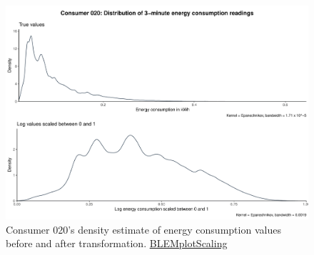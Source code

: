 \begin{centering}
\begin{figure}[!htbp]
        \includegraphics[width=\textwidth-0.85cm]{thesis/graphs/c020_density.pdf}
        \caption[Energy consumption distribution before and after transformation]{Consumer 020's density estimate of energy consumption values before and after transformation. \quantnet\href{ }{BLEMplotScaling}}
\end{figure}
\end{centering}


